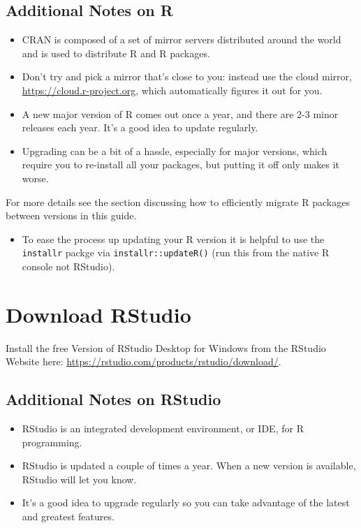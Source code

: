 \documentclass[
]{book}
\providecommand{\tightlist}{%
  \setlength{\itemsep}{0pt}\setlength{\parskip}{0pt}}
\begin{document}
\hypertarget{additional-notes-on-r}{%
\subsection{Additional Notes on R}\label{additional-notes-on-r}}

\begin{itemize}
\item
  CRAN is composed of a set of mirror servers distributed around the world and
  is used to distribute R and R packages.
\item
  Don't try and pick a mirror that's close to you: instead use the cloud mirror,
  \url{https://cloud.r-project.org}, which automatically figures it out for you.
\item
  A new major version of R comes out once a year, and there are 2-3 minor
  releases each year. It's a good idea to update regularly.
\item
  Upgrading can be a bit of a hassle, especially for major versions, which
  require you to re-install all your packages, but putting it off only makes it
  worse.
\end{itemize}

For more details see the section discussing how to efficiently migrate R
packages between versions in this guide.

\begin{itemize}
\tightlist
\item
  To ease the process up updating your R version it is helpful to use the
  \texttt{installr} packge via \texttt{installr::updateR()} (run this from the native R
  console not RStudio).
\end{itemize}

\hypertarget{download-rstudio}{%
\section{Download RStudio}\label{download-rstudio}}

Install the free Version of RStudio Desktop for Windows from the RStudio Website here: \url{https://rstudio.com/products/rstudio/download/}.

\hypertarget{additional-notes-on-rstudio}{%
\subsection{Additional Notes on RStudio}\label{additional-notes-on-rstudio}}

\begin{itemize}
\item
  RStudio is an integrated development environment, or IDE, for R programming.
\item
  RStudio is updated a couple of times a year. When a new version is available,
  RStudio will let you know.
\item
  It's a good idea to upgrade regularly so you can take advantage of the latest
  and greatest features.
\end{itemize}
\end{document}
